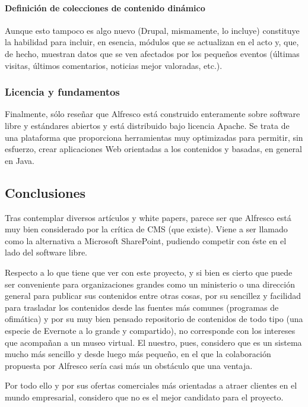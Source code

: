 \paragraph{Definición de colecciones de contenido dinámico} Aunque esto tampoco es algo nuevo (Drupal, mismamente, lo incluye) constituye la habilidad para incluir, en esencia, módulos que se actualizan en el acto y, que, de hecho, muestran datos que se ven afectados por los pequeños eventos (últimas visitas, últimos comentarios, noticias mejor valoradas, etc.).

\subsubsection{Licencia y fundamentos}
\par Finalmente, sólo reseñar que Alfresco está construido enteramente sobre software libre y estándares abiertos y está distribuido bajo licencia Apache.
Se trata de una plataforma que proporciona herramientas muy optimizadas para permitir, sin esfuerzo, crear aplicaciones Web orientadas a los contenidos y basadas, en general en Java.

\subsection{Conclusiones}
\par Tras contemplar diversos artículos y white papers, parece ser que Alfresco está muy bien considerado por la crítica de CMS (que existe). Viene a ser llamado como la alternativa a Microsoft SharePoint, pudiendo competir con éste en el lado del software libre.
\par Respecto a lo que tiene que ver con este proyecto, y si bien es cierto que puede ser conveniente para organizaciones grandes como un ministerio o una dirección general para publicar sus contenidos entre otras cosas, por su sencillez y facilidad para trasladar los contenidos desde las fuentes más comunes (programas de ofimática) y por su muy bien pensado repositorio de contenidos de todo tipo (una especie de Evernote a lo grande y compartido), no corresponde con los intereses que acompañan a un museo virtual. El nuestro, pues, considero que es un sistema mucho más sencillo y desde luego más pequeño, en el que la colaboración propuesta por Alfresco sería casi más un obstáculo que una ventaja.

\par Por todo ello y por sus ofertas comerciales más orientadas a atraer clientes en el mundo empresarial, considero que no es el mejor candidato para el proyecto.